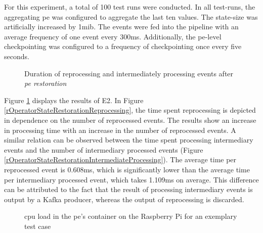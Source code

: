 For this experiment, a total of 100 test runs were conducted. In all test-runs, the aggregating \gls{pe} was configured to aggregate the last ten values. The state-size was artificially increased by 1\gls{mib}. The events were fed into the pipeline with an average frequency of one event every 300ms. Additionally, the \gls{pe}-level checkpointing was configured to a frequency of checkpointing once every five seconds.\par


\begin{figure}[!ht]
    \centering
    \caption{Duration of reprocessing and intermediately processing events after \textit{\acrshort{pe} restoration}}%
    \label{rOperatorStateRestorationDuration}%
\end{figure}


Figure \ref{rOperatorStateRestorationDuration} displays the results of E2. In Figure \ref{rOperatorStateRestorationReprocessing}, the time spent reprocessing is depicted in dependence on the number of reprocessed events. The results show an increase in processing time with an increase in the number of reprocessed events. A similar relation can be observed between the time spent processing intermediary events and the number of intermediary processed events (Figure \ref{rOperatorStateRestorationIntermediateProcessing}). The average time per reprocessed event is 0.608ms, which is significantly lower than the average time per intermediary processed event, which takes 1.109ms on average. This difference can be attributed to the fact that the result of processing intermediary events is output by a Kafka producer, whereas the output of reprocessing is discarded.\par

\begin{figure}[!ht]
    \centering
    \graphicspath{{./figures/code/}}
    
    \caption{\gls{cpu} load in the \gls{pe}'s container on the Raspberry Pi for an exemplary test case}
    \label{rOperatorStateRestorationCPU}
\end{figure}

